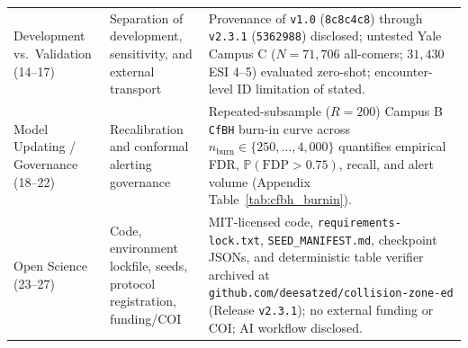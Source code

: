 \begin{table}[h!]
\begin{tabular}{>{\raggedright\arraybackslash}p{}>{\raggedright\arraybackslash}p{}>{\raggedright\arraybackslash}p{}}
Development vs.\ Validation (14--17) & Separation of development, sensitivity, and external transport & Provenance of \texttt{v1.0} (\texttt{8c8c4c8}) through \texttt{v2.3.1} (\texttt{5362988}) disclosed; untested Yale Campus C ($N=71{,}706$ all-comers; $31{,}430$ ESI 4--5) evaluated zero-shot; encounter-level ID limitation of \citet{hong2018predicting} stated. \\
Model Updating / Governance (18--22) & Recalibration and conformal alerting governance & Repeated-subsample ($R=200$) Campus B \texttt{CfBH} burn-in curve across $n_{\text{burn}}\in\{250,\dots,4{,}000\}$ quantifies empirical FDR, $\mathbb{P}(\text{FDP}>0.75)$, recall, and alert volume (Appendix Table~\ref{tab:cfbh_burnin}). \\
Open Science (23--27) & Code, environment lockfile, seeds, protocol registration, funding/COI & MIT-licensed code, \texttt{requirements-lock.txt}, \texttt{SEED\_MANIFEST.md}, checkpoint JSONs, and deterministic table verifier archived at \texttt{github.com/deesatzed/collision-zone-ed} (Release \texttt{v2.3.1}); no external funding or COI; AI workflow disclosed. \\
\bottomrule
\end{tabular}
\end{table}
